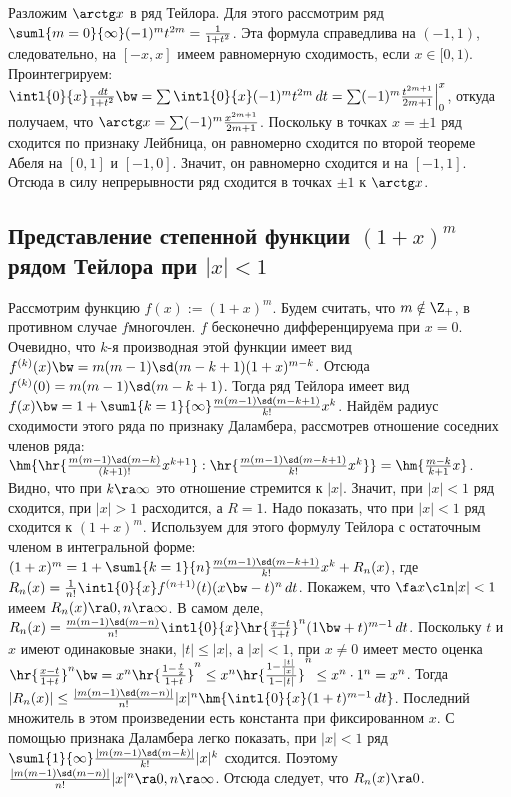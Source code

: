 \documentclass[a4paper]{article}
\begin{document}
Разложим $\arctg x$ в ряд Тейлора. Для этого рассмотрим ряд
$\suml{m=0}{\infty}(-1)^mt^{2m}=\frac{1}{1+t^2}$. Эта формула справедлива на $(-1,1)$,
следовательно, на $[-x,x]$ имеем равномерную сходимость, если $x \in [0,1)$. Проинтегрируем:
$\intl{0}{x}\frac{\,d t}{1+t^2}\bw=\sum \intl{0}{x}(-1)^mt^{2m}\,d t=\sum
(-1)^m\frac{t^{2m+1}}{2m+1}\Bigl|_0^x$, откуда получаем, что $\arctg x = \sum
(-1)^m\frac{x^{2m+1}}{2m+1}$. Поскольку в точках $x=\pm 1$ ряд сходится по признаку Лейбница, он
равномерно сходится по второй теореме Абеля на $[0,1]$ и $[-1,0]$. Значит, он равномерно сходится и
на $[-1,1]$. Отсюда в силу непрерывности ряд сходится в точках $\pm 1$ к $\arctg x$.

\subsection{Представление степенной функции $(1+x)^m$ рядом Тейлора при $|x| < 1$}

Рассмотрим функцию $f(x) := (1+x)^m$. Будем считать, что $m \notin \Z_+$, в противном
случае $f$\т многочлен. $f$ бесконечно дифференцируема при $x=0$. Очевидно, что $k$-я производная
этой функции имеет вид $f^{(k)}(x) \bw= m(m-1)\sd(m-k+1)(1+x)^{m-k}$. Отсюда $f^{(k)}(0) =
m(m-1)\sd(m-k+1)$. Тогда ряд Тейлора имеет вид $f(x)\bw=1 +
\suml{k=1}{\infty}\frac{m(m-1)\sd(m-k+1)}{k!} x^k$. Найдём радиус сходимости этого ряда по признаку
Даламбера, рассмотрев отношение соседних членов ряда: $\hm{\hr{
\frac{m(m-1)\sd(m-k)}{(k+1)!}x^{k+1}} : \hr{ \frac{m(m-1)\sd(m-k+1)}{k!}x^k}}
=\hm{\frac{m-k}{k+1}x} $. Видно, что при $k \ra \infty$ это отношение стремится к $|x|$. Значит,
при $|x| < 1$ ряд сходится, при $|x| > 1$ расходится, а $R=1$. Надо показать, что при $|x|<1$ ряд
сходится к $(1+x)^m$. Используем для этого формулу Тейлора с остаточным членом в интегральной
форме: $(1+x)^m=1 + \suml{k=1}{n}\frac{m(m-1)\sd(m-k+1)}{k!} x^k + R_n(x)$, где $R_n(x) =
\frac{1}{n!}\intl{0}{x}f^{(n+1)}(t)(x\bw-t)^n\,d t$. Покажем, что $\fa x\cln |x|<1$ имеем $R_n(x) \ra 0,
n \ra \infty$. В самом деле, $R_n(x)=\frac{m(m-1)\sd(m-n)}{n!}\intl{0}{x}\hr{ \frac{x-t}{1+t}}
^n(1\bw+t)^{m-1}\,d t$. Поскольку $t$ и $x$ имеют одинаковые знаки, $|t|\le |x|$, а $|x| < 1$, при $x
\neq 0$ имеет место оценка $\hr{ \frac{x-t}{1+t}} ^n \bw= x^n\hr{ \frac{1-\frac{t}{x}}{1+t}} ^n \le
x^n \hr{ \frac{1-\frac{|t|}{|x|}}{1-|t|}} ^n \le x^n \cdot 1^n = x^n$. Тогда $|R_n(x)| \le
\frac{|m(m-1)\sd(m-n)|}{n!}|x|^n \hm{\intl{0}{x}(1+t)^{m-1}\,d t} $. Последний множитель в этом
произведении есть константа при фиксированном $x$. С помощью признака Даламбера легко показать, при
$|x|<1$ ряд $\suml{1}{\infty}\frac{|m(m-1)\sd(m-k)|}{k!}|x|^k$ сходится. Поэтому
$\frac{|m(m-1)\sd(m-n)|}{n!}|x|^n \ra 0, n \ra \infty$. Отсюда следует, что $R_n(x) \ra 0$.
\end{document}
